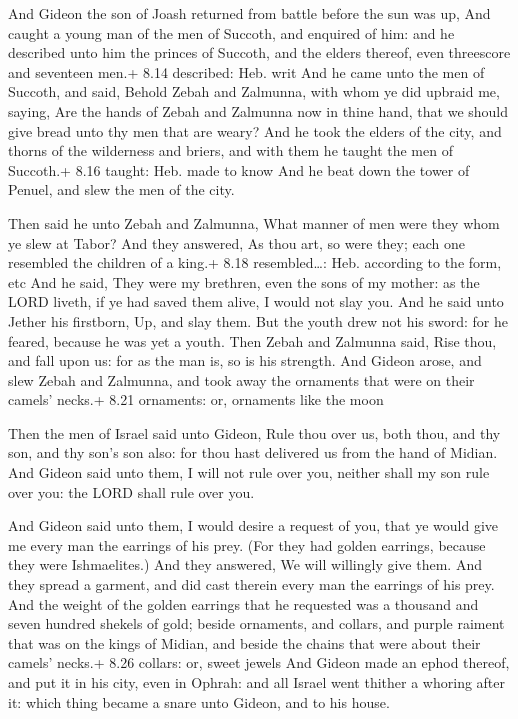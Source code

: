  And Gideon the son of Joash returned from battle before
the sun was up,  And caught a young man of the men of
Succoth, and enquired of him: and he described unto him the princes of
Succoth, and the elders thereof, even threescore and seventeen men.+
8.14 described: Heb. writ  And he came unto the men of
Succoth, and said, Behold Zebah and Zalmunna, with whom ye did upbraid
me, saying, Are the hands of Zebah and Zalmunna now in thine hand, that
we should give bread unto thy men that are weary?  And he
took the elders of the city, and thorns of the wilderness and briers,
and with them he taught the men of Succoth.+ 8.16 taught: Heb. made to
know  And he beat down the tower of Penuel, and slew the
men of the city.

 Then said he unto Zebah and Zalmunna, What manner of men
were they whom ye slew at Tabor? And they answered, As thou art, so were
they; each one resembled the children of a king.+ 8.18 resembled\ldots:
Heb. according to the form, etc  And he said, They were my
brethren, even the sons of my mother: as the LORD liveth, if ye had
saved them alive, I would not slay you.  And he said unto
Jether his firstborn, Up, and slay them. But the youth drew not his
sword: for he feared, because he was yet a youth.  Then
Zebah and Zalmunna said, Rise thou, and fall upon us: for as the man is,
so is his strength. And Gideon arose, and slew Zebah and Zalmunna, and
took away the ornaments that were on their camels' necks.+ 8.21
ornaments: or, ornaments like the moon

 Then the men of Israel said unto Gideon, Rule thou over
us, both thou, and thy son, and thy son's son also: for thou hast
delivered us from the hand of Midian.  And Gideon said unto
them, I will not rule over you, neither shall my son rule over you: the
LORD shall rule over you.

 And Gideon said unto them, I would desire a request of
you, that ye would give me every man the earrings of his prey. (For they
had golden earrings, because they were Ishmaelites.)  And
they answered, We will willingly give them. And they spread a garment,
and did cast therein every man the earrings of his prey. 
And the weight of the golden earrings that he requested was a thousand
and seven hundred shekels of gold; beside ornaments, and collars, and
purple raiment that was on the kings of Midian, and beside the chains
that were about their camels' necks.+ 8.26 collars: or, sweet jewels
 And Gideon made an ephod thereof, and put it in his city,
even in Ophrah: and all Israel went thither a whoring after it: which
thing became a snare unto Gideon, and to his house.

